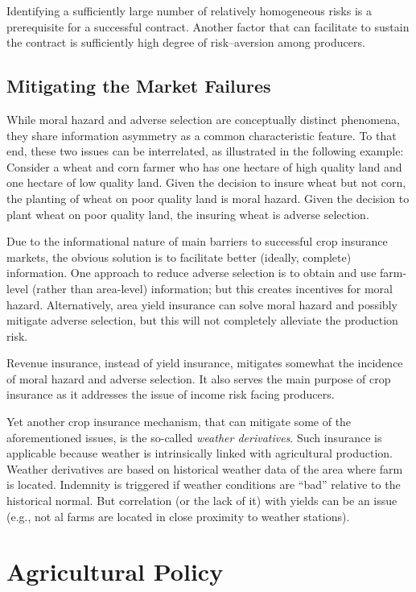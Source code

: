 \documentclass[
]{book}
\begin{document}
Identifying a sufficiently large number of relatively homogeneous risks is a prerequisite for a successful contract. Another factor that can facilitate to sustain the contract is sufficiently high degree of risk--aversion among producers.

\hypertarget{mitigating-the-market-failures}{%
\section{Mitigating the Market Failures}\label{mitigating-the-market-failures}}

While moral hazard and adverse selection are conceptually distinct phenomena, they share information asymmetry as a common characteristic feature. To that end, these two issues can be interrelated, as illustrated in the following example: Consider a wheat and corn farmer who has one hectare of high quality land and one hectare of low quality land. Given the decision to insure wheat but not corn, the planting of wheat on poor quality land is moral hazard. Given the decision to plant wheat on poor quality land, the insuring wheat is adverse selection.

Due to the informational nature of main barriers to successful crop insurance markets, the obvious solution is to facilitate better (ideally, complete) information. One approach to reduce adverse selection is to obtain and use farm-level (rather than area-level) information; but this creates incentives for moral hazard. Alternatively, area yield insurance can solve moral hazard and possibly mitigate adverse selection, but this will not completely alleviate the production risk.

Revenue insurance, instead of yield insurance, mitigates somewhat the incidence of moral hazard and adverse selection. It also serves the main purpose of crop insurance as it addresses the issue of income risk facing producers.

Yet another crop insurance mechanism, that can mitigate some of the aforementioned issues, is the so-called \emph{weather derivatives}. Such insurance is applicable because weather is intrinsically linked with agricultural production. Weather derivatives are based on historical weather data of the area where farm is located. Indemnity is triggered if weather conditions are ``bad'' relative to the historical normal. But correlation (or the lack of it) with yields can be an issue (e.g., not al farms are located in close proximity to weather stations).

\hypertarget{agricultural-policy}{%
\chapter{Agricultural Policy}\label{agricultural-policy}}
\end{document}
